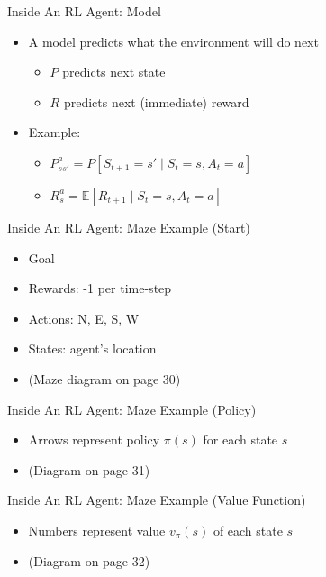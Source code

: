 \documentclass[presentation]{beamer}
\begin{document}
\begin{frame}[label={sec:org2e5e56e}]{Inside An RL Agent: Model}
\begin{itemize}
\item A model predicts what the environment will do next
\begin{itemize}
\item \(P\) predicts next state
\item \(R\) predicts next (immediate) reward
\end{itemize}
\item Example:
\begin{itemize}
\item \(P^a_{ss'} = P[S_{t+1}=s' \mid S_t=s, A_t=a]\)
\item \(R^a_s = \mathbb{E}[R_{t+1} \mid S_t=s, A_t=a]\)
\end{itemize}
\end{itemize}
\end{frame}
\begin{frame}[label={sec:org276d77e}]{Inside An RL Agent: Maze Example (Start)}
\begin{itemize}
\item Goal
\item Rewards: -1 per time-step
\item Actions: N, E, S, W
\item States: agent’s location
\item (Maze diagram on page 30)
\end{itemize}
\end{frame}
\begin{frame}[label={sec:orge360fd1}]{Inside An RL Agent: Maze Example (Policy)}
\begin{itemize}
\item Arrows represent policy \(\pi(s)\) for each state \(s\)
\item (Diagram on page 31)
\end{itemize}
\end{frame}
\begin{frame}[label={sec:orge924aaf}]{Inside An RL Agent: Maze Example (Value Function)}
\begin{itemize}
\item Numbers represent value \(v_\pi(s)\) of each state \(s\)
\item (Diagram on page 32)
\end{itemize}
\end{frame}
\end{document}
